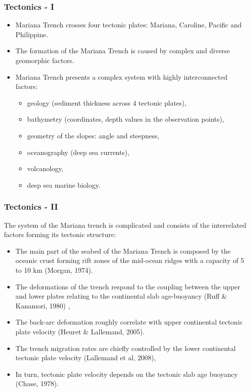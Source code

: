 \documentclass[pdflatex,compress,10pt,
	xcolor={dvipsnames,dvipsnames,svgnames,x11names,table},
	hyperref={colorlinks = true,breaklinks = true, urlcolor = NavyBlue, breaklinks = true}]{beamer}
\begin{document}
\begin{frame}\frametitle{Tectonics - I}
\begin{itemize}
    \item<1-> Mariana Trench crosses four tectonic plates: Mariana, Caroline, Pacific and Philippine. 
    \item<2-> The formation of the Mariana Trench is caused by complex and diverse geomorphic factors. 
    \item<3-> Mariana Trench presents a complex system with highly interconnected factors: 
    	 \begin{itemize}
            	\item geology (sediment thickness across 4 tectonic plates), 
            	\item bathymetry (coordinates, depth values in the observation points), 
           	 \item geometry of the slopes: angle and steepness, 
           	 \item oceanography (deep sea currents), 
           	 \item volcanology,
            	\item deep sea marine biology. 
           \end{itemize}
\end{itemize}
\end{frame}

\begin{frame}\frametitle{Tectonics - II}
The system of the Mariana trench is complicated and consists of the interrelated factors forming its tectonic structure:
 \begin{itemize}
            \item The main part of the seabed of the Mariana Trench is composed by the oceanic crust forming rift zones of the mid-ocean ridges with a capacity of 5 to 10 km (Morgan, 1974). 
            \item The deformations of the trench respond to the coupling between the upper and lower plates relating to the continental slab age-buoyancy (Ruff \& Kanamori, 1980) ,
            \item The back-arc deformation roughly correlate with upper continental tectonic plate velocity (Heuret \& Lallemand, 2005). 
            \item The trench migration rates are chiefly controlled by the lower continental tectonic plate velocity (Lallemand et al, 2008), 
            \item In turn, tectonic plate velocity depends on the tectonic slab age buoyancy (Chase, 1978).
\end{itemize}
\end{frame}
\end{document}
